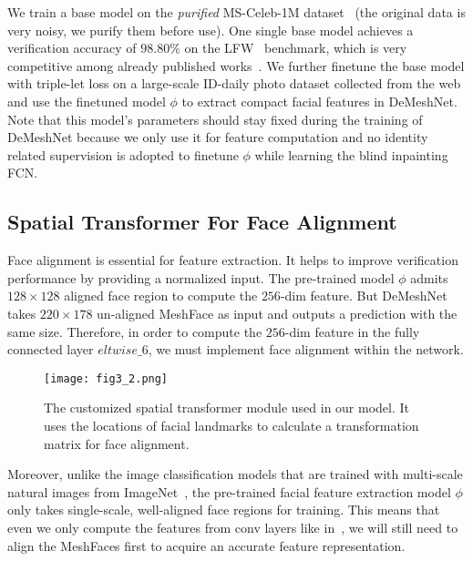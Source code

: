 \documentclass[10pt,twocolumn,letterpaper]{article}
\begin{document}
We train a base model on the \textit{purified} MS-Celeb-1M dataset~\cite{guo2016ms} (the original data is very noisy, we purify them before use). One single base model achieves a verification accuracy of $98.80\%$ on the LFW~\cite{LFWTech} benchmark, which is very competitive among already published works~\cite{ding2015robust,wang2015face}. We further finetune the base model with triple-let loss on a large-scale ID-daily photo dataset collected from the web and use the finetuned model $\phi$ to extract compact facial features in DeMeshNet. Note that this model's parameters should stay fixed during the training of DeMeshNet because we only use it for feature computation and no identity related supervision is adopted to finetune $\phi$ while learning the blind inpainting FCN.






\subsection{Spatial Transformer For Face Alignment} Face alignment is essential for feature extraction. It helps to improve verification performance by providing a normalized input. The pre-trained model $\phi$ admits $128\times 128$ aligned face region to compute the $256$-dim feature. But DeMeshNet takes $220\times 178$ un-aligned MeshFace as input and outputs a prediction with the same size. Therefore, in order to compute the $256$-dim feature in the fully connected layer $eltwise\_6$, we must implement face alignment within the network.

\begin{figure}
  \centering
    \texttt{[image: fig3\_2.png]}
    \caption{The customized spatial transformer module used in our model. It uses the locations of facial landmarks to calculate a transformation matrix for face alignment.}
    \label{fig:stn} %
\end{figure}

Moreover, unlike the image classification models that are trained with multi-scale natural images from ImageNet~\cite{russakovsky2015imagenet}, the pre-trained facial feature extraction model $\phi$ only takes single-scale, well-aligned face regions for training. This means that even we only compute the features from conv layers like in~\cite{guccluturk2016convolutional,johnson2016perceptual,LedigTHCATTWS16}, we will still need to align the MeshFaces first to acquire an accurate feature representation.
\end{document}
